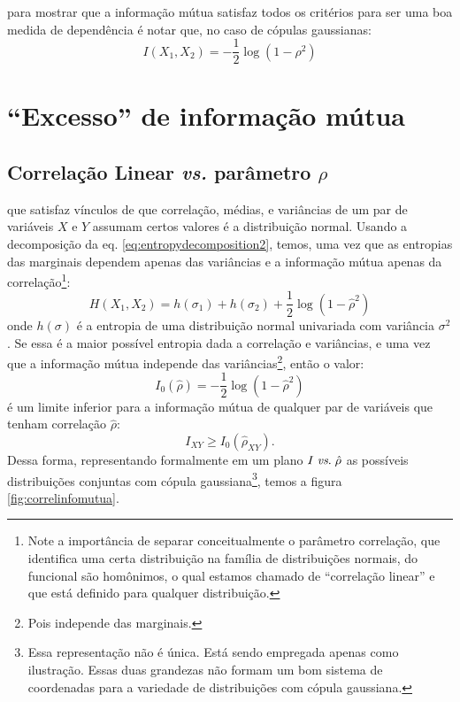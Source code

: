  para mostrar que a informação mútua satisfaz todos os critérios para ser uma boa medida de dependência é notar que, no caso de cópulas gaussianas:
\begin{equation}
\label{eq:infonormal}
I(X_1,X_2) =  - \frac{1}{2}\log\left(1 - \rho^2\right)
\end{equation}
\section{``Excesso'' de informação mútua}
\subsection{Correlação Linear \textit{vs.} parâmetro $\rho$	}
 que satisfaz vínculos de que correlação, médias, e variâncias de um par de variáveis $X$ e $Y$ assumam certos valores é a distribuição normal. Usando a decomposição da eq. \eqref{eq:entropydecomposition2}, temos, uma vez que as entropias das marginais dependem apenas das variâncias e a informação mútua apenas da correlação\footnote{Note a importância de separar conceitualmente o parâmetro correlação, que identifica uma certa distribuição na família de distribuições normais, do funcional são homônimos, o qual estamos chamado de ``correlação linear'' e que está definido para qualquer distribuição.}:
\begin{equation*}
H(X_1,X_2) = h(\sigma_1) + h(\sigma_2) + \frac{1}{2}\log\left(1 - \hat{\rho}^2\right)
\end{equation*}
onde $h(\sigma)$ é a entropia de uma distribuição normal univariada com variância $\sigma^2$. Se essa é a maior possível entropia dada a correlação e variâncias, e uma vez que a informação mútua independe das variâncias\footnote{Pois independe das marginais.}, então o valor:
\begin{equation}
\label{eq:mutinfogaussian}
 I_{0}(\hat{\rho}) = - \frac{1}{2}\log\left(1 - \hat{\rho}^2\right)
\end{equation}
é um limite inferior para a informação mútua de qualquer par de variáveis que tenham correlação $\hat{\rho}$:
\begin{equation}
\label{eq:gaussianinequality}
 I_{XY} \ge I_{0}(\hat{\rho}_{XY}).
\end{equation}
Dessa forma, representando formalmente em um plano $I\;\mbox{\textit{vs}.}\;\hat{\rho}$ as possíveis distribuições conjuntas com cópula gaussiana\footnote{Essa representação não é única. Está sendo empregada apenas como ilustração. Essas duas grandezas não formam um bom sistema de coordenadas para a variedade de distribuições com cópula gaussiana.}, temos a figura \ref{fig:correlinfomutua}.
